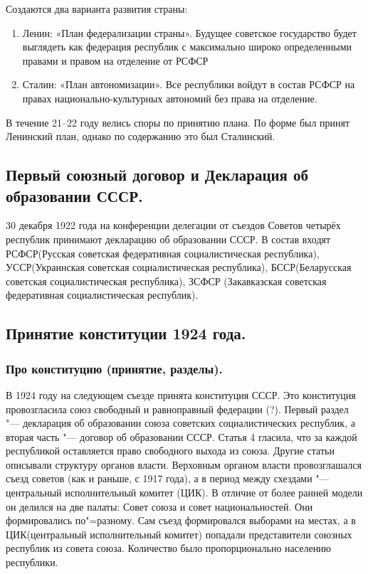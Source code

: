 Создаются два варианта развития страны:

\begin{enumerate}
    \item Ленин: «План федерализации страны». Будущее советское государство будет выглядеть как федерация республик с максимально широко определенными правами и правом на отделение от РСФСР
    \item Сталин: «План автономизации». Все республики войдут в состав РСФСР на правах национально-культурных автономий без права на отделение.
\end{enumerate}

В  течение 21--22 году велись споры по принятию плана. По форме был принят Ленинский план, однако по содержанию это был Сталинский.

\subsection{Первый союзный договор и Декларация об образовании СССР.}

30 декабря 1922 года на конференции делегации от съездов Советов четырёх республик принимают декларацию об образовании СССР. В состав входят РСФСР(Русская советская федеративная социалистическая республика), УССР(Украинская советская социалистическая республика), БССР(Беларусская советская социалистическая республика), ЗСФСР (Закавказская советская федеративная социалистическая республик).

\subsection{Принятие конституции 1924 года.}

\subsubsection{\textbf{Про конституцию (принятие, разделы).}}
В 1924 году на следующем съезде принята конституция СССР. Это конституция провозгласила союз свободный и равноправный федерации (?). Первый раздел "--- декларация об образовании союза советских социалистических республик, а вторая часть "--- договор об образовании СССР. Статья 4 гласила, что за каждой республикой оставляется право свободного выхода из союза. Другие статьи описывали структуру органов власти. Верховным органом власти провозглашался съезд советов (как и раньше, с 1917 года), а в период между схездами "--- центральный исполнительный комитет (ЦИК). В отличие от более ранней модели он делился на две палаты: Совет союза и совет национальностей. Они формировались по"=разному. Сам съезд формировался выборами на местах, а в ЦИК(центральный исполнительный комитет) попадали представители союзных республик из совета союза. Количество было пропорционально населению республики.

